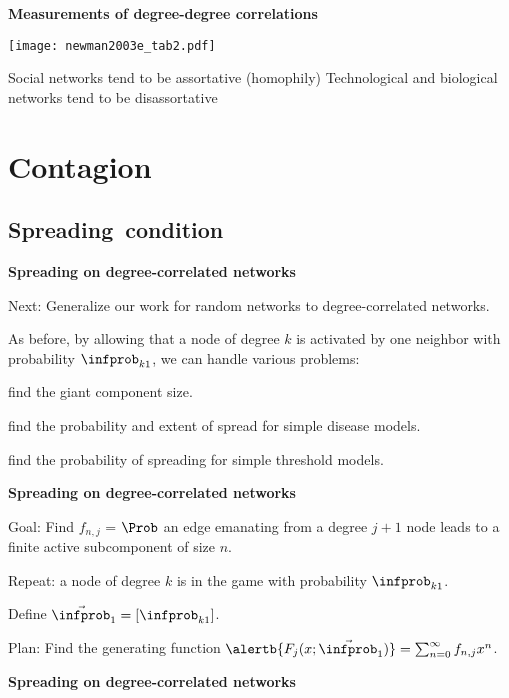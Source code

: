   



  \textbf{Measurements of degree-degree correlations}
  
  \texttt{[image: newman2003e\_tab2.pdf]}

  
   Social networks tend to be assortative (homophily)
   Technological and biological networks tend to be disassortative
  


\section{Contagion}

\subsection{Spreading\ condition}

  \textbf{Spreading on degree-correlated networks}

  
   
    Next: Generalize our work for random networks to
    degree-correlated networks.
   
    As before, by allowing that a node of degree $k$
    is activated by one neighbor with probability
    $\infprob_{k1}$, we can handle various problems:
    
     
      find the giant component size.
     
      find the probability and extent of spread
      for simple disease models.
     
      find the probability of spreading
      for simple threshold models.
    
    
  


  \textbf{Spreading on degree-correlated networks}

  
   
    \alert{Goal:} Find $f_{n,j}$ = $\Prob$ an edge 
    emanating from a degree $j+1$ node leads to
    a finite active subcomponent of size $n$.
  
    Repeat: a node of degree $k$ is in the game with
    probability $\infprob_{k1}$.
  
    Define $\vec{\infprob}_1 = [\infprob_{k1}]$.
  
    \alert{Plan:} Find the generating function
    $\alertb{F_j(x;\vec{\infprob}_1)} = \sum_{n=0}^\infty f_{n,j} x^n$.
  


  \textbf{Spreading on degree-correlated networks}

